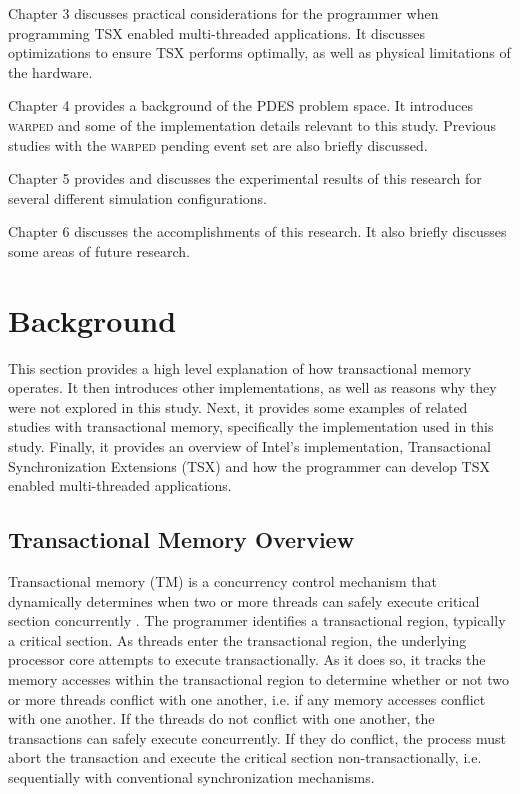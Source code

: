 \documentclass[11pt]{book}
\begin{document}
Chapter 3 discusses practical considerations for the programmer when programming TSX
enabled multi-threaded applications.  It discusses optimizations to ensure TSX performs
optimally, as well as physical limitations of the hardware.

Chapter 4 provides a background of the PDES problem space.  It introduces \textsc{warped} and some
of the implementation details relevant to this study. Previous studies with the \textsc{warped}
pending event set are also briefly discussed.

Chapter 5 provides and discusses the experimental results of this research for several
different simulation configurations.

Chapter 6 discusses the accomplishments of this research.  It also briefly discusses some
areas of future research.


\chapter{Background}

This section provides a high level explanation of how transactional memory operates.  It
then introduces other implementations, as well as reasons why they were not explored in
this study.  Next, it provides some examples of related studies with transactional memory,
specifically the implementation used in this study. Finally, it provides an overview of
Intel's implementation, Transactional Synchronization Extensions (TSX) and how the
programmer can develop TSX enabled multi-threaded applications.

\section{Transactional Memory Overview}

Transactional memory (TM) is a concurrency control mechanism that dynamically determines
when two or more threads can safely execute critical section concurrently
\cite{sle_rajwar}.  The programmer identifies a transactional region, typically a critical
section.  As threads enter the transactional region, the underlying processor core
attempts to execute transactionally. As it does so, it tracks the memory accesses within
the transactional region to determine whether or not two or more threads conflict with one
another, i.e. if any memory accesses conflict with one another.  If the threads do not
conflict with one another, the transactions can safely execute concurrently.  If they do
conflict, the process must abort the transaction and execute the critical section
non-transactionally, i.e.  sequentially with conventional synchronization mechanisms.
\end{document}
